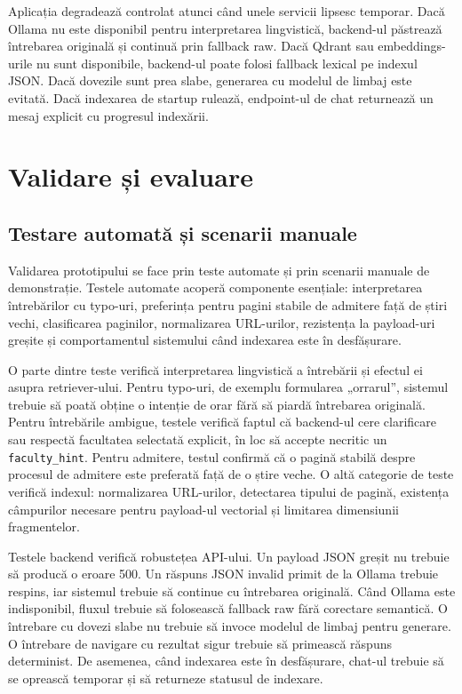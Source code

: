 \documentclass[12pt,a4paper]{report}
\theoremstyle{definition}
\theoremstyle{remark}
\begin{document}
Aplicația degradează controlat atunci când unele servicii lipsesc temporar. Dacă Ollama nu este disponibil pentru interpretarea lingvistică, backend-ul păstrează întrebarea originală și continuă prin fallback raw. Dacă Qdrant sau embeddings-urile nu sunt disponibile, backend-ul poate folosi fallback lexical pe indexul JSON. Dacă dovezile sunt prea slabe, generarea cu modelul de limbaj este evitată. Dacă indexarea de startup rulează, endpoint-ul de chat returnează un mesaj explicit cu progresul indexării.

\chapter{Validare și evaluare}

\section{Testare automată și scenarii manuale}
Validarea prototipului se face prin teste automate și prin scenarii manuale de demonstrație. Testele automate acoperă componente esențiale: interpretarea întrebărilor cu typo-uri, preferința pentru pagini stabile de admitere față de știri vechi, clasificarea paginilor, normalizarea URL-urilor, rezistența la payload-uri greșite și comportamentul sistemului când indexarea este în desfășurare.

O parte dintre teste verifică interpretarea lingvistică a întrebării și efectul ei asupra retriever-ului. Pentru typo-uri, de exemplu formularea „orrarul”, sistemul trebuie să poată obține o intenție de orar fără să piardă întrebarea originală. Pentru întrebările ambigue, testele verifică faptul că backend-ul cere clarificare sau respectă facultatea selectată explicit, în loc să accepte necritic un \texttt{faculty\_hint}. Pentru admitere, testul confirmă că o pagină stabilă despre procesul de admitere este preferată față de o știre veche. O altă categorie de teste verifică indexul: normalizarea URL-urilor, detectarea tipului de pagină, existența câmpurilor necesare pentru payload-ul vectorial și limitarea dimensiunii fragmentelor.

Testele backend verifică robustețea API-ului. Un payload JSON greșit nu trebuie să producă o eroare 500. Un răspuns JSON invalid primit de la Ollama trebuie respins, iar sistemul trebuie să continue cu întrebarea originală. Când Ollama este indisponibil, fluxul trebuie să folosească fallback raw fără corectare semantică. O întrebare cu dovezi slabe nu trebuie să invoce modelul de limbaj pentru generare. O întrebare de navigare cu rezultat sigur trebuie să primească răspuns determinist. De asemenea, când indexarea este în desfășurare, chat-ul trebuie să se oprească temporar și să returneze statusul de indexare.
\end{document}
